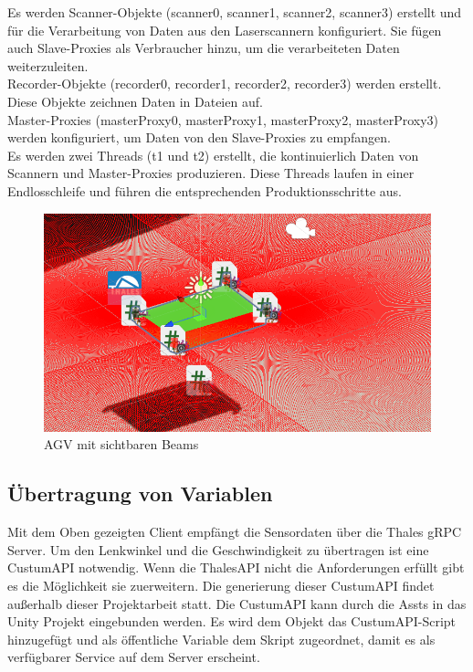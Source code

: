 Es werden Scanner-Objekte (scanner0, scanner1, scanner2, scanner3) erstellt und für die Verarbeitung von Daten aus den Laserscannern konfiguriert. Sie fügen auch Slave-Proxies als Verbraucher hinzu, um die verarbeiteten Daten weiterzuleiten.\\

Recorder-Objekte (recorder0, recorder1, recorder2, recorder3) werden erstellt. Diese Objekte zeichnen Daten in Dateien auf.\\

Master-Proxies (masterProxy0, masterProxy1, masterProxy2, masterProxy3) werden konfiguriert, um Daten von den Slave-Proxies zu empfangen.\\

Es werden zwei Threads (t1 und t2) erstellt, die kontinuierlich Daten von Scannern und Master-Proxies produzieren. Diese Threads laufen in einer Endlosschleife und führen die entsprechenden Produktionsschritte aus.\\
\begin{figure}[htp]
    \centering
    \includegraphics[width=(\textwidth/2)]{images/Mit_Beams.PNG}
    \caption{AGV mit sichtbaren Beams}
    \label{fig:Mit Beams}
\end{figure}



\subsection{Übertragung von Variablen}
Mit dem Oben gezeigten Client empfängt die Sensordaten über die Thales gRPC Server. Um den Lenkwinkel und die Geschwindigkeit zu übertragen ist eine CustumAPI notwendig.
Wenn die ThalesAPI nicht die Anforderungen erfüllt gibt es die Möglichkeit sie zuerweitern. Die generierung dieser CustumAPI findet außerhalb dieser Projektarbeit statt. Die CustumAPI kann durch die Assts in das Unity Projekt eingebunden werden.
Es wird dem Objekt das CustumAPI-Script hinzugefügt und als öffentliche Variable dem Skript zugeordnet, damit es als verfügbarer Service auf dem Server erscheint.

